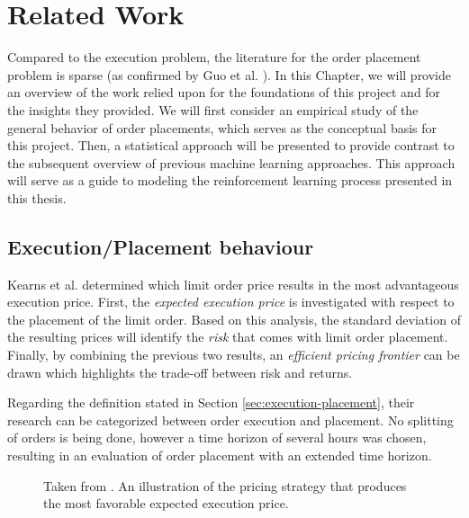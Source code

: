 \chapter{Related Work}
\label{chap:related-work}

Compared to the execution problem, the literature for the order placement problem is sparse (as confirmed by Guo et al. \cite{guo2013optimal}).
In this Chapter, we will provide an overview of the work relied upon for the foundations of this project and for the insights they provided.
We will first consider an empirical study of the general behavior of order placements, which serves as the conceptual basis for this project.
Then, a statistical approach will be presented to provide contrast to the subsequent overview of previous machine learning approaches.
This approach will serve as a guide to modeling the reinforcement learning process presented in this thesis.

\section{Execution/Placement behaviour}
\label{sec:related-execution-behaviour}

Kearns et al. \cite{nevmyvaka2005electronic} determined which limit order price results in the most advantageous execution price.
First, the \textit{expected execution price} is investigated with respect to the placement of the limit order. 
Based on this analysis, the standard deviation of the resulting prices will identify the \textit{risk} that comes with limit order placement. 
Finally, by combining the previous two results, an \textit{efficient pricing frontier} can be drawn which highlights the trade-off between risk and returns.

Regarding the definition stated in Section \ref{sec:execution-placement}, their research can be categorized between order execution and placement.
No splitting of orders is being done, however a time horizon of several hours was chosen, resulting in an evaluation of order placement with an extended time horizon.

\begin{figure}[H]
    \centering
    \caption{Taken from \cite{nevmyvaka2005electronic}. An illustration of the pricing strategy that produces the most favorable expected execution price.}
    \label{fig:kearns-return}
\end{figure}

